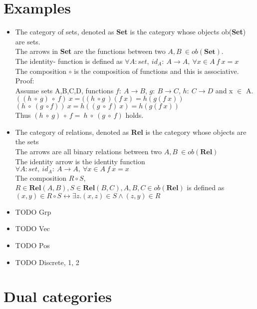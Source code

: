 \section {Examples}
\begin {itemize}

 \item The category of sets, denoted as \textbf{Set} is the category whose objects ob(\textbf{Set}) are sets.
   \\ The arrows in \textbf{Set} are the functions between two $A,B\ \in ob(\textbf{Set}).$
   \\ The identity- function is defined as $\forall A: set, \ id_A:\ A \to A,\ \forall x \in A \ f \ x = x$
   \\ The composition $\circ$ is the composition of functions and this is associative. Proof:
   \\ Assume sets A,B,C,D, functions $f:\ A \to B$, $g:\ B \to C$, $h:\ C \to D$ and x $\in$ A.
   \\ $((h\ \circ \ g)\ \circ\ f)\ x = ((h \ \circ g \ )(f \ x) =h(g(f\  x)) $
   \\ $(h\ \circ \ (g \ \circ f))\ x = h ((g\ \circ \ f) \ x) = h(g(f \ x))$
   \\ Thus $(h\ \circ \ g)\ \circ \ f = \ h \ \circ \ (g \ \circ \ f)$ holds. \Box \\

 \item The category of relations, denoted as \textbf{Rel} is the category whose objects are the sets
   \\The arrows are all binary relations between two $A,B \ \in ob(\textbf{Rel})$
   \\The identity arrow  is the identity function $\forall A: set, \ id_A:\ A \to A,\ \forall x \in A \ f \ x = x$
   \\ The composition $R \circ S$, $R  \in \textbf{Rel}(A,B), S \in \textbf{Rel}(B,C), A,B,C \in ob(\textbf{Rel})$ is defined as $ (x,y) \in  R \circ S \leftrightarrow \exists  z.(x,z) \in S \land (z,y) \in R$
  \item TODO Grp%
  \item TODO Vec%
  \item TODO Pos%
  \item TODO Discrete, 1, 2%
 \end {itemize}

 \section {Dual categories}

